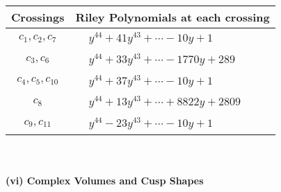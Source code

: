 \documentclass[1p]{elsarticle_modified}
\theoremstyle{definition}
\begin{document}
\begin{tabular}{m{50pt}|m{274pt}}
Crossings & \hspace{64pt}Riley Polynomials at each crossing \\
\hline $$\begin{aligned}c_{1},c_{2},c_{7}\end{aligned}$$&$\begin{aligned}
&y^{44}+41 y^{43}+\cdots-10 y+1
\end{aligned}$\\
\hline $$\begin{aligned}c_{3},c_{6}\end{aligned}$$&$\begin{aligned}
&y^{44}+33 y^{43}+\cdots-1770 y+289
\end{aligned}$\\
\hline $$\begin{aligned}c_{4},c_{5},c_{10}\end{aligned}$$&$\begin{aligned}
&y^{44}+37 y^{43}+\cdots-10 y+1
\end{aligned}$\\
\hline $$\begin{aligned}c_{8}\end{aligned}$$&$\begin{aligned}
&y^{44}+13 y^{43}+\cdots+8822 y+2809
\end{aligned}$\\
\hline $$\begin{aligned}c_{9},c_{11}\end{aligned}$$&$\begin{aligned}
&y^{44}-23 y^{43}+\cdots-10 y+1
\end{aligned}$\\
\hline
\end{tabular}\\~\\
\newpage\flushleft \textbf{(vi) Complex Volumes and Cusp Shapes}
\end{document}
